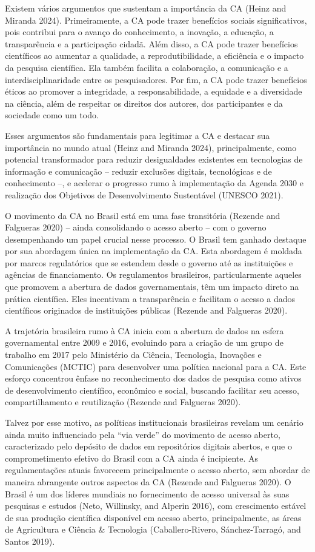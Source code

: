 \documentclass[
  a4paper,
]{article}
\begin{document}
Existem vários argumentos que sustentam a importância da CA (Heinz and
Miranda 2024). Primeiramente, a CA pode trazer benefícios sociais
significativos, pois contribui para o avanço do conhecimento, a
inovação, a educação, a transparência e a participação cidadã. Além
disso, a CA pode trazer benefícios científicos ao aumentar a qualidade,
a reprodutibilidade, a eficiência e o impacto da pesquisa científica.
Ela também facilita a colaboração, a comunicação e a
interdisciplinaridade entre os pesquisadores. Por fim, a CA pode trazer
benefícios éticos ao promover a integridade, a responsabilidade, a
equidade e a diversidade na ciência, além de respeitar os direitos dos
autores, dos participantes e da sociedade como um todo.

Esses argumentos são fundamentais para legitimar a CA e destacar sua
importância no mundo atual (Heinz and Miranda 2024), principalmente,
como potencial transformador para reduzir desigualdades existentes em
tecnologias de informação e comunicação -- reduzir exclusões digitais,
tecnológicas e de conhecimento --, e acelerar o progresso rumo à
implementação da Agenda 2030 e realização dos Objetivos de
Desenvolvimento Sustentável (UNESCO 2021).

O movimento da CA no Brasil está em uma fase transitória (Rezende and
Falgueras 2020) -- ainda consolidando o acesso aberto -- com o governo
desempenhando um papel crucial nesse processo. O Brasil tem ganhado
destaque por sua abordagem única na implementação da CA. Esta abordagem
é moldada por marcos regulatórios que se estendem desde o governo até as
instituições e agências de financiamento. Os regulamentos brasileiros,
particularmente aqueles que promovem a abertura de dados governamentais,
têm um impacto direto na prática científica. Eles incentivam a
transparência e facilitam o acesso a dados científicos originados de
instituições públicas (Rezende and Falgueras 2020).

A trajetória brasileira rumo à CA inicia com a abertura de dados na
esfera governamental entre 2009 e 2016, evoluindo para a criação de um
grupo de trabalho em 2017 pelo Ministério da Ciência, Tecnologia,
Inovações e Comunicações (MCTIC) para desenvolver uma política nacional
para a CA. Este esforço concentrou ênfase no reconhecimento dos dados de
pesquisa como ativos de desenvolvimento científico, econômico e social,
buscando facilitar seu acesso, compartilhamento e reutilização (Rezende
and Falgueras 2020).

Talvez por esse motivo, as políticas institucionais brasileiras revelam
um cenário ainda muito influenciado pela ``via verde'' do movimento de
acesso aberto, caracterizado pelo depósito de dados em repositórios
digitais abertos, e que o comprometimento efetivo do Brasil com a CA
ainda é incipiente. As regulamentações atuais favorecem principalmente o
acesso aberto, sem abordar de maneira abrangente outros aspectos da CA
(Rezende and Falgueras 2020). O Brasil é um dos líderes mundiais no
fornecimento de acesso universal às suas pesquisas e estudos (Neto,
Willinsky, and Alperin 2016), com crescimento estável de sua produção
científica disponível em acesso aberto, principalmente, as áreas de
Agricultura e Ciência \& Tecnologia (Caballero-Rivero, Sánchez-Tarragó,
and Santos 2019).
\end{document}
